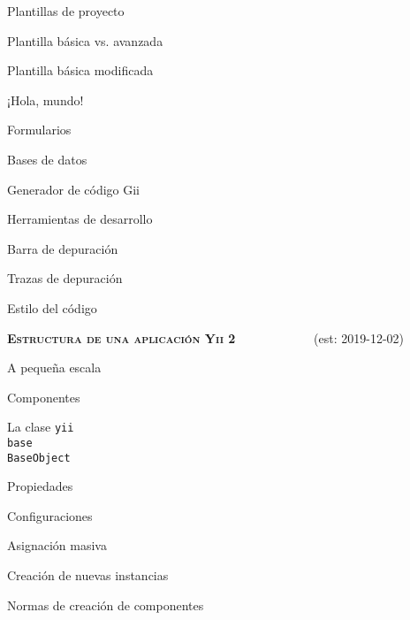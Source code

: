 \begin{longenum}
\begin{longenum}
\begin{longenum}
\begin{longenum}
            \end{longenum}
            \item Plantillas de proyecto
            \begin{longenum}
                \item Plantilla básica vs. avanzada
                \item Plantilla básica modificada
            \end{longenum}
        \end{longenum}
        \item ¡Hola, mundo!
        \item Formularios
        \item Bases de datos
        \item Generador de código Gii
        \item Herramientas de desarrollo
        \begin{longenum}
            \item Barra de depuración
            \item Trazas de depuración
        \end{longenum}
        \item Estilo del código
    \end{longenum}
    \item \textbf{\textsc{Estructura de una aplicación Yii 2}} \ \ \ \ \ \ \ \ \ \ \ \ (est: \mbox{2019-12-02})
    \begin{longenum}
        \item A pequeña escala
        \begin{longenum}
            \item Componentes
            \begin{longenum}
                \item La clase \texttt{yii\\base\\BaseObject}
                \begin{longenum}
                    \item Propiedades
                    \item Configuraciones
                    \begin{longenum}
                        \item Asignación masiva
                        \item Creación de nuevas instancias
                        \item Normas de creación de componentes

\end{longenum}
\end{longenum}
\end{longenum}
\end{longenum}
\end{longenum}
\end{longenum}
